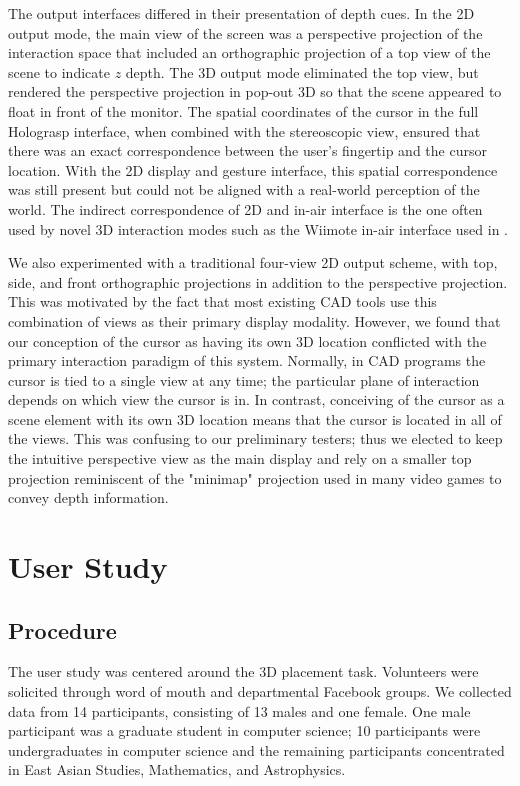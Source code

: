 \documentclass[pageno]{jpaper}
\begin{document}
The output interfaces differed in their presentation of depth cues. In the 2D output mode,
the main view of the screen was a perspective projection of the interaction space that
included an orthographic projection of a top view of the scene to indicate $z$ depth. The 3D output mode eliminated the top
view, but rendered the perspective projection in pop-out 3D so that the scene appeared to
float in front of the monitor. The spatial coordinates of the cursor in the full Holograsp interface, when combined
with the stereoscopic view, ensured that there was an exact correspondence between the user's fingertip
and the cursor location. With the 2D display and gesture interface, this spatial correspondence was still present but could not
be aligned with a real-world perception of the world. The indirect correspondence of 2D and in-air interface is the one
often used by novel 3D interaction modes such as the Wiimote in-air interface used in \cite{study1}.

We also experimented with a traditional four-view 2D output
scheme, with top, side, and front orthographic projections in addition to the perspective projection.
This was motivated by the fact that most existing CAD tools use this combination of views as their
primary display modality. However, we found that our conception of the cursor as having its own
3D location conflicted with the primary interaction paradigm of this system. Normally, in CAD programs
the cursor is tied to a single view at any time; the particular plane of interaction depends on which view
the cursor is in. In contrast, conceiving of the cursor as a scene element with its own 3D location means
that the cursor is located in all of the views. This was confusing to our preliminary testers; thus we elected to keep the intuitive perspective view as the
main display and rely on a smaller top projection reminiscent of the "minimap" projection used in many
video games to convey depth information.

\newpage
\section{User Study}
\subsection{Procedure}
The user study was centered around the 3D placement task. Volunteers were solicited
through word of mouth and departmental Facebook groups. We collected data from 14 participants,
consisting of 13 males and one female. One male participant was a graduate student in computer
science; 10 participants were undergraduates in computer science and the remaining participants
concentrated in East Asian Studies, Mathematics, and Astrophysics.
\end{document}
